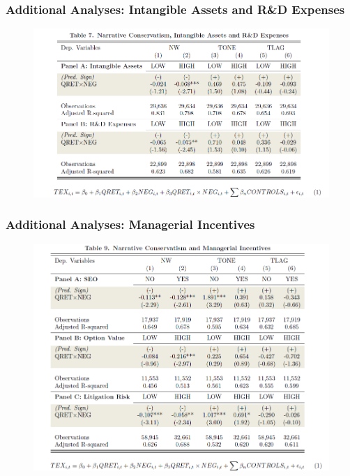 \documentclass{beamer}
\begin{document}
\begin{frame}
	\frametitle{Additional Analyses: Intangible Assets and R\&D Expenses}
	\begin{figure}[h]
	\centering
	\includegraphics[width=0.9\linewidth]{tab7}
	\label{tab7}
	\end{figure}
	
\end{frame}
	
\begin{frame}
	\frametitle{Additional Analyses: Managerial Incentives}
	\begin{figure}[h]
	\centering
	\includegraphics[width=0.8\linewidth]{tab9}
	\label{tab9}
	\end{figure}
\end{frame}
\end{document}
